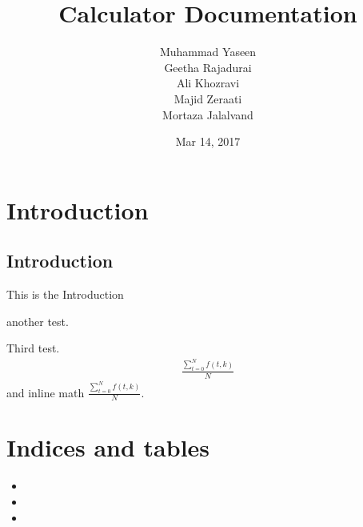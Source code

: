 \documentclass[letterpaper,10pt,english]{sphinxmanual}
\title{Calculator Documentation}
\date{Mar 14, 2017}
\author{Muhammad Yaseen\\Geetha Rajadurai\\Ali Khozravi\\Majid Zeraati\\Mortaza Jalalvand}
\begin{document}
\maketitle
\sphinxtableofcontents
{}\label{\detokenize{index::doc}}



\chapter{Introduction}
\label{\detokenize{index:introduction}}\label{\detokenize{index:welcome-to-calculator-s-documentation}}

\section{Introduction}
\label{\detokenize{index:id1}}
This is the Introduction

\begin{sphinxVerbatim}[commandchars=\\\{\}]
  \PYG{p}{[}      \PYG{p}{]}
\PYG{p}{[}\PYG{p}{]}
\PYG{p}{[}\PYG{p}{]}
\PYG{p}{[}\PYG{p}{]}

\end{sphinxVerbatim}

another test.

\begin{sphinxVerbatim}[commandchars=\\\{\}]

  

   
      
   
\end{sphinxVerbatim}

Third test.
\begin{equation*}
\begin{split}\frac{ \sum_{t=0}^{N}f(t,k) }{N}\end{split}
\end{equation*}
and inline math \(\frac{ \sum_{t=0}^{N}f(t,k) }{N}\).


\chapter{Indices and tables}
\label{\detokenize{index:indices-and-tables}}\begin{itemize}
\item {} 

\item {} 

\item {} 

\end{itemize}



\renewcommand{\indexname}{Index}
\printindex
\end{document}
